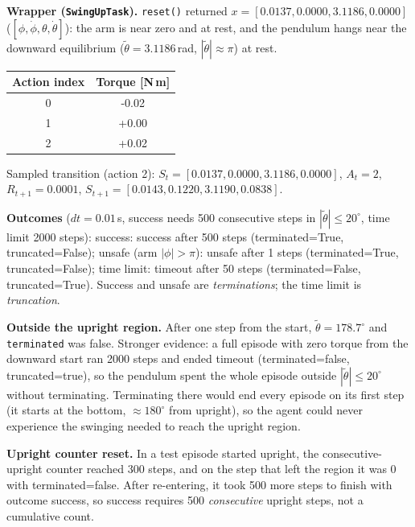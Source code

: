 \documentclass[11pt]{article}
\newcommand{\initstate}{[0.0137, 0.0000, 3.1186, 0.0000]}
\newcommand{\inittheta}{3.1186}
\newcommand{\dt}{0.01}
\newcommand{\successsteps}{500}
\newcommand{\maxsteps}{2000}
\newcommand{\transS}{[0.0137, 0.0000, 3.1186, 0.0000]}
\newcommand{\transA}{2}
\newcommand{\transR}{0.0001}
\newcommand{\transSn}{[0.0143, 0.1220, 3.1190, 0.0838]}
\newcommand{\outsidedeg}{178.7}
\newcommand{\ctrBefore}{300}
\newcommand{\ctrAfter}{0}
\newcommand{\ctrTermExit}{false}
\newcommand{\ctrReentry}{500}
\newcommand{\ctrOutcome}{success}
\newcommand{\zeroSteps}{2000}
\newcommand{\zeroTerm}{false}
\newcommand{\zeroTrunc}{true}
\newcommand{\zeroOutcome}{timeout}
\newcommand{\outsuccess}{success after 500 steps (terminated=True, truncated=False)}
\newcommand{\outunsafe}{unsafe after 1 steps (terminated=True, truncated=False)}
\newcommand{\outtimeout}{timeout after 50 steps (terminated=False, truncated=True)}
\begin{document}
\textbf{Wrapper (\texttt{SwingUpTask}).} \texttt{reset()} returned $x=\initstate$ ($[\phi,\dot\phi,\theta,\dot\theta]$): the arm is near zero and at rest, and the pendulum hangs near the downward equilibrium ($\widetilde\theta=\inittheta$\,rad, $|\widetilde\theta|\approx\pi$) at rest.
\begin{center}\begin{tabular}{cc}
\toprule
Action index & Torque [N\,m] \\
\midrule
0 & -0.02 \\
1 & +0.00 \\
2 & +0.02 \\
\bottomrule
\end{tabular}\end{center}
Sampled transition (action 2): $S_t=\transS$, $A_t=\transA$, $R_{t+1}=\transR$, $S_{t+1}=\transSn$.

\textbf{Outcomes} ($dt=\dt$\,s, success needs \successsteps{} consecutive steps in $|\widetilde\theta|\le20^\circ$, time limit \maxsteps{} steps): success: \outsuccess; unsafe (arm $|\phi|>\pi$): \outunsafe; time limit: \outtimeout. Success and unsafe are \emph{terminations}; the time limit is \emph{truncation}.

\textbf{Outside the upright region.} After one step from the start, $\widetilde\theta=\outsidedeg^\circ$ and \texttt{terminated} was false. Stronger evidence: a full episode with zero torque from the downward start ran \zeroSteps{} steps and ended \zeroOutcome{} (terminated=\zeroTerm, truncated=\zeroTrunc), so the pendulum spent the whole episode outside $|\widetilde\theta|\le20^\circ$ without terminating. Terminating there would end every episode on its first step (it starts at the bottom, $\approx180^\circ$ from upright), so the agent could never experience the swinging needed to reach the upright region.

\textbf{Upright counter reset.} In a test episode started upright, the consecutive-upright counter reached \ctrBefore{} steps, and on the step that left the region it was \ctrAfter{} with terminated=\ctrTermExit. After re-entering, it took \ctrReentry{} more steps to finish with outcome \ctrOutcome, so success requires \successsteps{} \emph{consecutive} upright steps, not a cumulative count.
\end{document}
